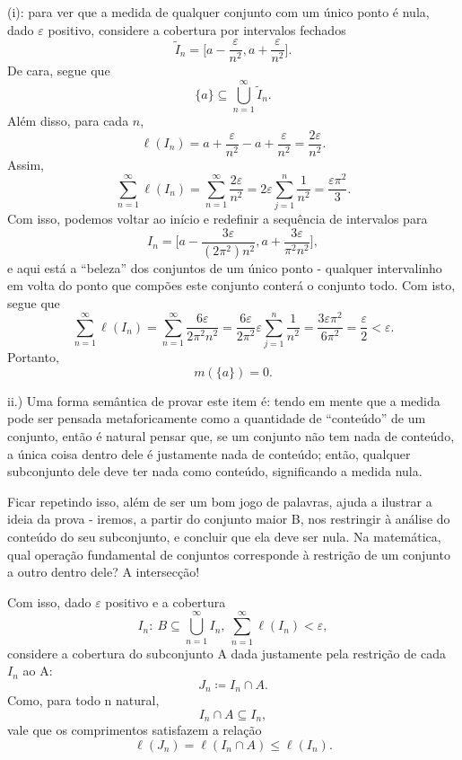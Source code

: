 \documentclass[../analysisII_notes.tex]{subfiles}
\begin{document}
\begin{proof*}
	(i): para ver que a medida de qualquer conjunto com um único ponto é nula, dado \(\varepsilon \) positivo, considere a cobertura por intervalos fechados
	\[
		\tilde{I}_{n} = \biggl[a - \frac{\varepsilon }{n^{2}}, a+\frac{\varepsilon }{n^{2}}\biggr].
	\]
	De cara, segue que
	\[
		\{a\}\subseteq \bigcup_{n=1}^{\infty} \tilde{I}_{n}.
	\]
	Além disso, para cada \(n\),
	\[
		\ell (I_{n}) = a + \frac{\varepsilon }{n^{2}} - a+\frac{\varepsilon }{n^{2}} = \frac{2\varepsilon }{n^{2}}.
	\]
	Assim,
	\[
		\sum\limits_{n=1}^{\infty}\ell (I_{n}) = \sum\limits_{n=1}^{\infty}\frac{2\varepsilon }{n^{2}} = 2\varepsilon \sum\limits_{j=1}^{n}\frac{1}{n^{2}} = \frac{\varepsilon \pi^{2}}{3}.
	\]
	Com isso, podemos voltar ao início e redefinir a sequência de intervalos para
	\[
		I_{n} =\biggl[a - \frac{3\varepsilon }{(2\pi^{2})n^{2}}, a+\frac{3\varepsilon }{\pi^{2}n^{2}}\biggr],
	\]
	e aqui está a ``beleza'' dos conjuntos de um único ponto - qualquer intervalinho em volta do ponto que compões este conjunto conterá o conjunto todo. Com isto, segue que
	\[
		\sum\limits_{n=1}^{\infty}\ell (I_{n}) = \sum\limits_{n=1}^{\infty}\frac{6\varepsilon }{2\pi^{2}n^{2}} = \frac{6\varepsilon }{2\pi^{2}}\varepsilon \sum\limits_{j=1}^{n}\frac{1}{n^{2}} = \frac{3\varepsilon \pi^{2}}{6\pi^{2}} = \frac{\varepsilon }{2} < \varepsilon.
	\]
	Portanto,
	\[
		m(\{a\}) = 0.
	\]

	ii.) Uma forma semântica de provar este item é: tendo em mente que a medida pode ser pensada metaforicamente como a quantidade de ``conteúdo'' de um conjunto, então é natural pensar que, se um conjunto não tem nada de conteúdo, a única coisa dentro dele é justamente nada de conteúdo; então, qualquer subconjunto dele deve ter nada como conteúdo, significando a medida nula.

	Ficar repetindo isso, além de ser um bom jogo de palavras, ajuda a ilustrar a ideia da prova - iremos, a partir do conjunto maior B, nos restringir à análise do conteúdo do seu subconjunto, e concluir que ela deve ser nula. Na matemática, qual operação fundamental de conjuntos corresponde à restrição de um conjunto a outro dentro dele? A intersecção!

	Com isso, dado \(\varepsilon \) positivo e a cobertura
	\[
		I_{n}:\: B\subseteq \bigcup_{n=1}^{\infty}I_{n},\: \sum\limits_{n=1}^{\infty}\ell (I_{n})<\varepsilon ,
	\]
	considere a cobertura do subconjunto A dada justamente pela restrição de cada \(I_{n}\) ao A:
	\[
		J_{n}\coloneqq I_{n}\cap A.
	\]
	Como, para todo n natural,
	\[
		I_{n}\cap A \subseteq I_{n},
	\]
	vale que os comprimentos satisfazem a relação
	\[
		\ell (J_{n})=\ell (I_{n}\cap A)\leq \ell (I_{n}).
	\]


\end{proof*}
\end{document}

